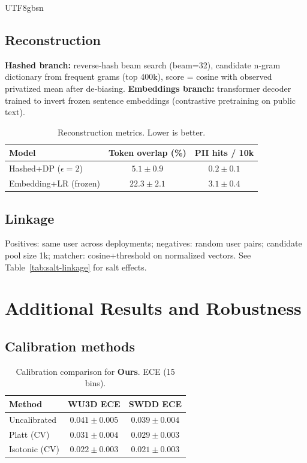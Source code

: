 \documentclass[acmsmall,natbib]{acmart}
\begin{document}
\begin{CJK*}{UTF8}{gbsn}
\subsection{Reconstruction}
\textbf{Hashed branch:} reverse‑hash beam search (beam=32), candidate n‑gram dictionary from frequent grams (top 400k), score = cosine with observed privatized mean after de‑biasing.  
\textbf{Embeddings branch:} transformer decoder trained to invert frozen sentence embeddings (contrastive pretraining on public text).

\begin{table}[h]
\centering
\caption{Reconstruction metrics. Lower is better.}
\label{tab:recon}
\setlength{\tabcolsep}{5.2pt}
\begin{tabular}{lcc}
\toprule
\textbf{Model} & \textbf{Token overlap (\%)} & \textbf{PII hits / 10k} \\
\midrule
Hashed+DP ($\epsilon{=}2$) & $\mathbf{5.1}{\pm}0.9$ & $\mathbf{0.2}{\pm}0.1$ \\
Embedding+LR (frozen) & $22.3{\pm}2.1$ & $3.1{\pm}0.4$ \\
\bottomrule
\end{tabular}
\end{table}

\subsection{Linkage}
Positives: same user across deployments; negatives: random user pairs; candidate pool size 1k; matcher: cosine+threshold on normalized vectors. See Table~\ref{tab:salt-linkage} for salt effects.


\section{Additional Results and Robustness}
\label{app:robustness}

\subsection{Calibration methods}
\begin{table}[h]
\centering
\caption{Calibration comparison for \textbf{Ours}. ECE (15 bins).}
\label{tab:calib}
\setlength{\tabcolsep}{9pt}
\begin{tabular}{lcc}
\toprule
\textbf{Method} & \textbf{WU3D ECE} & \textbf{SWDD ECE} \\
\midrule
Uncalibrated & $0.041{\pm}0.005$ & $0.039{\pm}0.004$ \\
Platt (CV) & $0.031{\pm}0.004$ & $0.029{\pm}0.003$ \\
Isotonic (CV) & $\mathbf{0.022}{\pm}0.003$ & $\mathbf{0.021}{\pm}0.003$ \\
\bottomrule
\end{tabular}
\end{table}


\end{CJK*}
\end{document}
